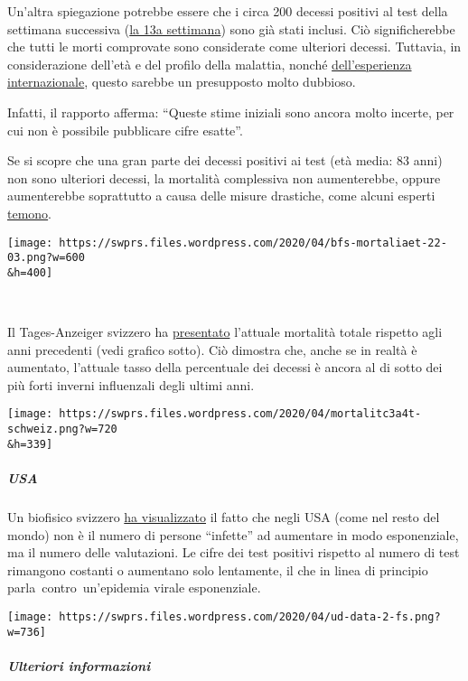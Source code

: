 Un'altra spiegazione potrebbe essere che i circa 200 decessi positivi al
test della settimana successiva
(\href{https://it.wikipedia.org/wiki/Pandemia_di_COVID-19_del_2020_in_Svizzera}{la
13a settimana}) sono già stati inclusi. Ciò significherebbe che tutti le
morti comprovate sono considerate come ulteriori decessi. Tuttavia, in
considerazione dell'età e del profilo della malattia, nonché
\href{https://swprs.org/rki-relativiert-corona-todesfaelle/}{dell'esperienza
internazionale}, questo sarebbe un presupposto molto dubbioso.

Infatti, il rapporto afferma: ``Queste stime iniziali sono ancora molto
incerte, per cui non è possibile pubblicare cifre esatte''.

Se si scopre che una gran parte dei decessi positivi ai test (età media:
83 anni) non sono ulteriori decessi, la mortalità complessiva non
aumenterebbe, oppure aumenterebbe soprattutto a causa delle misure
drastiche, come alcuni esperti
\href{https://swprs.org/offener-brief-von-professor-sucharit-bhakdi-an-bundeskanzlerin-dr-angela-merkel/}{temono}.

\texttt{[image: https://swprs.files.wordpress.com/2020/04/bfs-mortaliaet-22-03.png?w=600\\\&h=400]}

~

Il Tages-Anzeiger svizzero ha
\href{https://interaktiv.tagesanzeiger.ch/2020/uebersterblichkeit-wegen-coronavirus/}{presentato}
l'attuale mortalità totale rispetto agli anni precedenti (vedi grafico
sotto). Ciò dimostra che, anche se in realtà è aumentato, l'attuale
tasso della percentuale dei decessi è ancora al di sotto dei più forti
inverni influenzali degli ultimi anni.

\texttt{[image: https://swprs.files.wordpress.com/2020/04/mortalitc3a4t-schweiz.png?w=720\\\&h=339]}

\hypertarget{usa}{%
\subparagraph{USA}\label{usa}}

Un biofisico svizzero
\href{https://swprs.org/rate-of-positive-covid19-tests/}{ha
visualizzato} il fatto che negli USA (come nel resto del mondo) non è il
numero di persone ``infette'' ad aumentare in modo esponenziale, ma il
numero delle valutazioni. Le cifre dei test positivi rispetto al numero
di test rimangono costanti o aumentano solo lentamente, il che in linea
di principio parla~contro~un'epidemia virale esponenziale.

\texttt{[image: https://swprs.files.wordpress.com/2020/04/ud-data-2-fs.png?w=736]}

\hypertarget{ulteriori-informazioni}{%
\subparagraph{\texorpdfstring{\textbf{Ulteriori
informazioni}}{Ulteriori informazioni}}\label{ulteriori-informazioni}}


